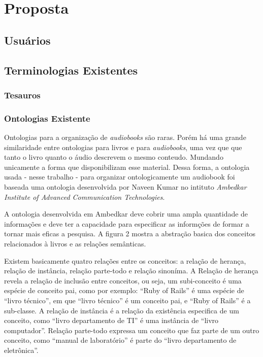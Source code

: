 \chapter{Proposta}\label{cap4}

\section{Usuários}


\section{Terminologias Existentes}

\subsection{Tesauros}

\subsection{Ontologias Existente}
Ontologias para a organização de \textit{audiobooks} são raras. Porém há uma grande similaridade entre ontologias para livros e para \textit{audiobooks}, uma vez que que tanto o livro quanto o áudio descrevem o mesmo conteudo. Mundando unicamente a forma que disponibilizam esse material. Dessa forma, a ontologia usada - nesse trabalho - para organizar ontologicamente um audiobook foi baseada uma ontologia desenvolvida por Naveen Kumar no intituto \textit{Ambedkar Institute of Advanced Communication Technologies}. 

A ontologia desenvolvida em Ambedkar deve cobrir uma ampla quantidade de informações e deve ter a capacidade para especificar as informções de formar a tornar mais eficas a pesquisa\cite{ontologybook}. A figura 2 mostra a abstração basica dos conceitos relacionados à livros e as relações semânticas. 

Existem basicamente quatro relações entre os conceitos: a relação de herança, relação de instância, relação parte-todo e relação sinoníma. A Relação de herança revela a relação de inclusão entre conceitos, ou seja, um subi-conceito é uma espécie de conceito pai, como por exemplo: ``Ruby of Rails'' é uma espécie de ``livro técnico'', em que ``livro técnico'' é um conceito pai, e ``Ruby of Rails'' é a sub-classe. A relação de instância é a relação da existência especifica de um conceito, como ``livro departamento de TI'' é uma instância de ``livro computador''. Relação parte-todo expressa um conceito que faz parte de um outro conceito, como ``manual de laboratório'' é parte do ``livro departamento de eletrônica''.

